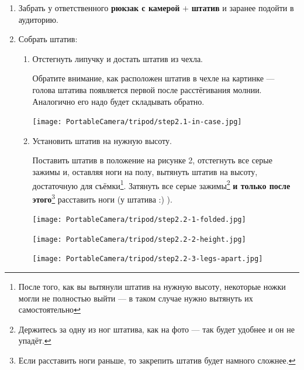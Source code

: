 \begin{enumerate}

  \item Забрать у ответственного \textbf{рюкзак с камерой} $+$ \textbf{штатив} и заранее подойти в аудиторию.

  \item Собрать штатив:
        \begin{enumerate}
          \item Отстегнуть липучку и достать штатив из чехла.

                \par Обратите внимание, как расположен штатив в чехле на картинке --- голова штатива появляется первой после расстёгивания молнии. Аналогично его надо будет складывать обратно.

                \begin{center}
                  \begin{minipage}[c]{0.4\textwidth}
                    \centering
                    \texttt{[image: PortableCamera/tripod/step2.1-in-case.jpg]}
                  \end{minipage}
                \end{center}

          \item Установить штатив на нужную высоту.
                \par Поставить штатив в положение на рисунке 2, отстегнуть все серые зажимы и, оставляя ноги на полу, вытянуть штатив на высоту, достаточную для съёмки\footnote{После того, как вы вытянули штатив на нужную высоту, некоторые ножки могли не полностью выйти --- в таком случае нужно вытянуть их самостоятельно}. Затянуть все серые зажимы\footnote{Держитесь за одну из ног штатива, как на фото --- так будет удобнее и он не упадёт.} \textbf{и только после этого}\footnote{Если расставить ноги раньше, то закрепить штатив будет намного сложнее.} расставить ноги (у штатива :) ).

                \begin{minipage}[c]{0.28\textwidth}
                  \centering
                  \texttt{[image: PortableCamera/tripod/step2.2-1-folded.jpg]}
                \end{minipage}
                \hfill
                \begin{minipage}[c]{0.28\textwidth}
                  \centering
                  \texttt{[image: PortableCamera/tripod/step2.2-2-height.jpg]}
                \end{minipage}
                \hfill
                \begin{minipage}[c]{0.28\textwidth}
                  \centering
                  \texttt{[image: PortableCamera/tripod/step2.2-3-legs-apart.jpg]}
                \end{minipage}


\end{enumerate}
\end{enumerate}
